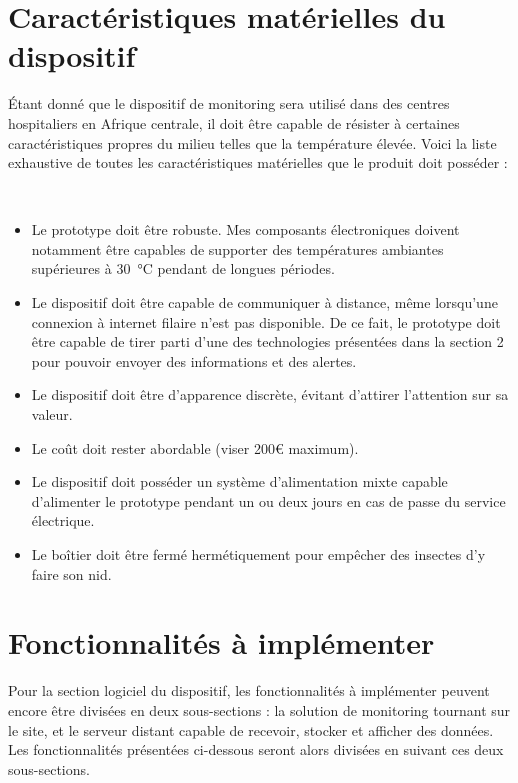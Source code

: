 \section{Caractéristiques matérielles du dispositif}
\label{sec:cahier_proto}

Étant donné que le dispositif de monitoring sera utilisé dans des centres hospitaliers en Afrique centrale, il doit être capable de résister à certaines caractéristiques propres du milieu telles que la température élevée. Voici la liste exhaustive de toutes les caractéristiques matérielles que le produit doit posséder :

~


\begin{itemize}
  \item Le prototype doit être robuste. Mes composants électroniques doivent notamment être capables de supporter des températures ambiantes supérieures à \SI{30}{\celsius} pendant de longues périodes. \cite{temperature_kinshasa}

  \item Le dispositif doit être capable de communiquer à distance, même lorsqu'une connexion à internet filaire n'est pas disponible. De ce fait, le prototype doit être capable de tirer parti d'une des technologies présentées dans la section 2 pour pouvoir envoyer des informations et des alertes.

  \item Le dispositif doit être d'apparence discrète, évitant d'attirer l'attention sur sa valeur.

  \item Le coût doit rester abordable (viser 200\euro{} maximum).

  \item Le dispositif doit posséder un système d'alimentation mixte capable d'alimenter le prototype pendant un ou deux jours en cas de passe du service électrique.

  \item Le boîtier doit être fermé hermétiquement pour empêcher des insectes d'y faire son nid.
\end{itemize}



\section{Fonctionnalités à implémenter}
\label{sec:cahier_soft}

Pour la section logiciel du dispositif, les fonctionnalités à implémenter peuvent encore être divisées en deux sous-sections : la solution de monitoring tournant sur le site, et le serveur distant capable de recevoir, stocker et afficher des données. Les fonctionnalités présentées ci-dessous seront alors divisées en suivant ces deux sous-sections.

